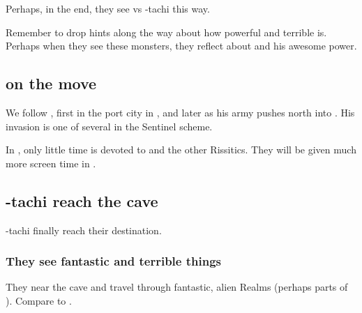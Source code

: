 Perhaps, in the end, they see \Ishnaruchaefir{} vs \Teshrial-tachi this way. 

Remember to drop hints along the way about how powerful and terrible \Ishnaruchaefir{} is. Perhaps when they see these monsters, they reflect about \Ishnaruchaefir{} and his awesome power. 







\subsection{\Narkiza{} on the move}

We follow \Narkiza{}, first in the port city in \Scyrum, and later as his army pushes north into \Velcad{}. His invasion is one of several  in the Sentinel scheme.

In \TwilightAngelRememberEmph, only little time is devoted to \Narkiza{} and the other Rissitics. They will be given much more screen time in \emph{\CarzainWithRedcorBook}. 













\subsection{\Shilred-tachi reach the cave}
\Shilred-tachi finally reach their destination. 





\subsubsection{They see fantastic and terrible things}
They near the cave and travel through fantastic, alien Realms (perhaps parts of ). Compare to . 

